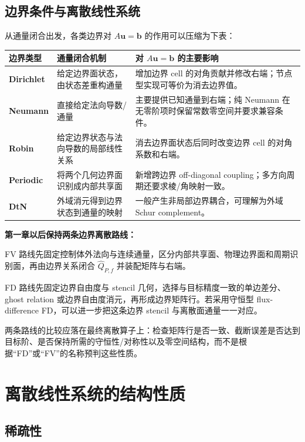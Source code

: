 \subsection{边界条件与离散线性系统}

从通量闭合出发，各类边界对 $A\bm u=\bm b$ 的作用可以压缩为下表：
\begin{center}
\small
\begin{tabularx}{0.96\textwidth}{>{\bfseries}p{2.5cm}X X}
\toprule
边界类型 & 通量闭合机制 & 对 $A\bm u=\bm b$ 的主要影响\\
\midrule
Dirichlet & 给定边界面状态，由状态差重构通量 & 增加边界 cell 的对角贡献并修改右端；节点型实现可等价为消去边界值。\\
Neumann & 直接给定法向导数/通量 & 主要提供已知通量到右端；纯 Neumann 在无零阶项时保留常数零空间并要求兼容条件。\\
Robin & 给定边界状态与法向导数的局部线性关系 & 消去边界面状态后同时改变边界 cell 的对角系数和右端。\\
Periodic & 将两个几何边界面识别成内部共享面 & 新增跨边界 off-diagonal coupling；多方向周期还要求棱/角映射一致。\\
DtN & 外域消元得到边界状态到通量的映射 & 一般产生非局部边界耦合，可理解为外域 Schur complement。\\
\bottomrule
\end{tabularx}
\end{center}

\begin{keybox}
\textbf{第一章以后保持两条边界离散路线：}

FV 路线先固定控制体外法向与连续通量，区分内部共享面、物理边界面和周期识别面，再由边界关系闭合 $\widehat Q_{P,f}$ 并装配矩阵与右端。

FD 路线先固定边界自由度与 stencil 几何，选择与目标精度一致的单边差分、ghost relation 或边界自由度消元，再形成边界矩阵行。若采用守恒型 flux-difference FD，可以进一步把这条边界 stencil 与离散面通量一一对应。

两条路线的比较应落在最终离散算子上：检查矩阵行是否一致、截断误差是否达到目标阶、是否保持所需的守恒性/对称性以及零空间结构，而不是根据“FD”或“FV”的名称预判这些性质。
\end{keybox}


\section{离散线性系统的结构性质}

\subsection{稀疏性}

